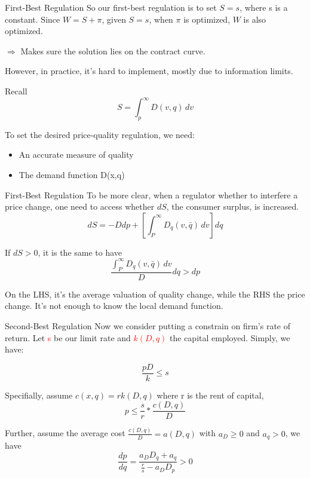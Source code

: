\documentclass[10pt]{beamer}
\begin{document}
\begin{frame}{First-Best Regulation}
So our first-best regulation is to set $S = s$, where s is a constant. Since $W = S + \pi$, given $S = s$, when $\pi$ is optimized, $W$ is also optimized.

$\Rightarrow$ Makes sure the solution lies on the contract curve.

However, in practice, it's hard to implement, mostly due to information limits. 

Recall
\begin{equation}
    S = \int_{p}^{\infty} D(v,q) \,dv
\end{equation}

To set the desired price-quality regulation, we need:
\begin{itemize}
    \item An accurate measure of quality
    \item The demand function D(x,q)
\end{itemize}
\end{frame}

\begin{frame}{First-Best Regulation}
To be more clear, when a regulator whether to interfere a price change, one need to access whether $dS$, the consumer surplus, is increased.
\begin{equation}
    dS = -D dp + [\int_{P}^{\infty} D_q(v,\bar{q})\,dv] dq
\end{equation}

If $dS > 0$, it is the same to have
\begin{equation}
    \frac{\int_{P}^{\infty} D_q(v,\bar{q})\,dv}{D} dq > dp
\end{equation}

On the LHS, it's the average valuation of quality change, while the RHS the price change. It's not enough to know the local demand function.
\end{frame}


\begin{frame}{Second-Best Regulation}
Now we consider putting a constrain on firm's rate of return. Let \textcolor{red}{s} be our limit rate and \textcolor{red}{$k(D,q)$} the capital employed. Simply, we have:

\begin{equation}
    \frac{pD}{k} \leq s
\end{equation}

Specifially, assume $c(x,q) = rk(D,q)$ where r is the rent of capital,
\begin{equation}
    p \leq \frac{s}{r} * \frac{c(D,q)}{D}
\end{equation}

Further, assume the average cost $\frac{c(D,q)}{D} = a(D,q)$ with $a_D \geq 0$ and $a_q > 0$, we have
\begin{equation}
    \frac{dp}{dq} = \frac{a_D D_q + a_q}{\frac{r}{s} - a_D D_p} > 0
\end{equation}
\end{frame}
\end{document}
